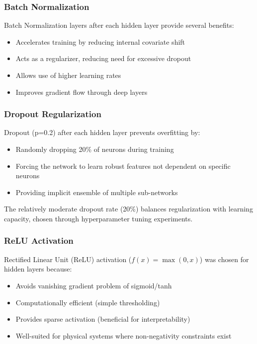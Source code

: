 \documentclass[12pt,a4paper]{report}
\begin{document}
\subsubsection{Batch Normalization}

Batch Normalization layers after each hidden layer provide several benefits:
\begin{itemize}
    \item Accelerates training by reducing internal covariate shift
    \item Acts as a regularizer, reducing need for excessive dropout
    \item Allows use of higher learning rates
    \item Improves gradient flow through deep layers
\end{itemize}

\subsubsection{Dropout Regularization}

Dropout (p=0.2) after each hidden layer prevents overfitting by:
\begin{itemize}
    \item Randomly dropping 20\% of neurons during training
    \item Forcing the network to learn robust features not dependent on specific neurons
    \item Providing implicit ensemble of multiple sub-networks
\end{itemize}

The relatively moderate dropout rate (20\%) balances regularization with learning capacity, chosen through hyperparameter tuning experiments.

\subsubsection{ReLU Activation}

Rectified Linear Unit (ReLU) activation ($f(x) = \max(0, x)$) was chosen for hidden layers because:
\begin{itemize}
    \item Avoids vanishing gradient problem of sigmoid/tanh
    \item Computationally efficient (simple thresholding)
    \item Provides sparse activation (beneficial for interpretability)
    \item Well-suited for physical systems where non-negativity constraints exist
\end{itemize}
\end{document}

